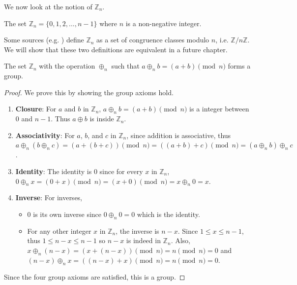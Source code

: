 We now look at the notion of $\mathbb{Z}_n$.
\begin{definition}
    The set $\mathbb{Z}_n = \{0, 1, 2, \dots, n-1\}$ where $n$ is a non-negative integer.
\end{definition}
\begin{remark}
    Some sources (e.g. \cite{clark_1984, humphreys_1996}) define $\mathbb{Z}_n$ as a set of congruence classes modulo $n$, i.e. $\mathbb{Z}/n\mathbb{Z}$. We will show that these two definitions are equivalent in a future chapter.
\end{remark}
\begin{proposition}
    The set $\mathbb{Z}_n$ with the operation $\oplus_n$ such that $a \oplus_n b = (a + b) \pmod{n}$ forms a group.
\end{proposition}
\begin{proof}
    We prove this by showing the group axioms hold.
    \begin{enumerate}
        \item \textbf{Closure}: For $a$ and $b$ in $\mathbb{Z}_n$, $a \oplus_n b = (a + b) \pmod{n}$ is a integer between 0 and $n - 1$. Thus $a \oplus b$ is inside $\mathbb{Z}_n$.
        \item \textbf{Associativity}: For $a$, $b$, and $c$ in $\mathbb{Z}_n$, since addition is associative, thus $a \oplus_n (b \oplus_n c) = (a + (b + c)) \pmod{n} = ((a + b) + c) \pmod{n} = (a \oplus_n b) \oplus_n c$.
        \item \textbf{Identity}: The identity is $0$ since for every $x$ in $\mathbb{Z}_n$, $0 \oplus_n x = (0 + x) \pmod{n} = (x + 0) \pmod{n} = x \oplus_n 0 = x$.
        \item \textbf{Inverse}: For inverses, \begin{itemize}
            \item $0$ is its own inverse since $0 \oplus_n 0 = 0$ which is the identity.
            \item For any other integer $x$ in $\mathbb{Z}_n$, the inverse is $n - x$. Since $1 \leq x \leq n - 1$, thus $1 \leq n - x \leq n - 1$ so $n - x$ is indeed in $\mathbb{Z}_n$. Also, $x \oplus_n (n - x) = (x + (n - x)) \pmod{n} = n \pmod{n} = 0$ and $(n - x) \oplus_n x = ((n-x) + x)\pmod{n} = n \pmod{n} = 0$.
        \end{itemize}
    \end{enumerate}
    Since the four group axioms are satisfied, this is a group.
\end{proof}

